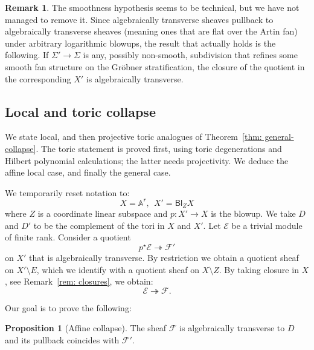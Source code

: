 \documentclass[11pt]{amsart}
\theoremstyle{definition}
\theoremstyle{definition}
\newtheorem{proposition}[theorem]{Proposition}
\newtheorem{remark}[theorem]{Remark}
\begin{document}
\begin{remark}
    The smoothness hypothesis seems to be technical, but we have not managed to remove it. Since algebraically transverse sheaves pullback to algebraically transverse sheaves (meaning ones that are flat over the Artin fan) under arbitrary logarithmic blowups, the result that actually holds is the following. If $\Sigma'\to \Sigma$ is any, possibly non-smooth, subdivision that refines some smooth fan structure on the Gr\"obner stratification, the closure of the quotient in the corresponding $X'$ is algebraically transverse. 
\end{remark}

\subsection{Local and toric collapse} We state local, and then projective toric analogues of Theorem~\ref{thm: general-collapse}. The toric statement is proved first, using toric degenerations and Hilbert polynomial calculations; the latter needs projectivity. We deduce the affine local case, and finally the general case. 

We temporarily reset notation to:
\[
X = \mathbb A^r, \ \ X' = \mathsf{Bl}_Z X
\]
where $Z$ is a coordinate linear subspace and $p\colon X'\to X$ is the blowup. We take $D$ and $D'$ to be the complement of the tori in $X$ and $X'$.  Let $\mathcal E$ be a trivial module of finite rank. Consider a quotient
\[
p^\star\mathcal E\twoheadrightarrow\mathcal F'
\]
on $X'$ that is algebraically transverse. By restriction we obtain a quotient sheaf on $X'\setminus E$, which we identify with a quotient sheaf on $X\setminus Z$. By taking closure in $X$, see Remark~\ref{rem: closures}, we obtain:
\[
\mathcal E\twoheadrightarrow \mathcal F.
\]

Our goal is to prove the following: 

\begin{proposition}[Affine collapse]\label{prop: local-collapse}
The sheaf $\mathcal F$ is algebraically transverse to $D$ and its pullback coincides with $\mathcal F'$. 
\end{proposition}
\end{document}
